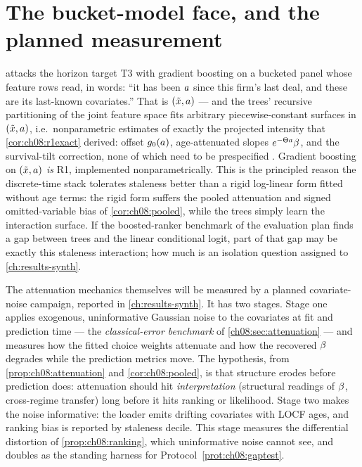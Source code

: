 \section{The bucket-model face, and the planned measurement}
\label{ch08:sec:buckets}

 attacks the horizon target T3 with gradient boosting
on a bucketed panel whose feature rows read, in words: ``it has been
$a$ since this firm's last deal, and these are its last-known
covariates.'' That is $(\tilde{x}, a)$ --- and the trees'
recursive partitioning of the joint feature space fits arbitrary
piecewise-constant surfaces in $(\tilde{x}, a)$, i.e.\
nonparametric estimates of exactly the projected intensity that
\cref{cor:ch08:r1exact} derived: offset $g_0(a)$,
age-attenuated slopes $e^{-\Theta a}\beta$, and the survival-tilt
correction, none of which need to be prespecified
\citep{friedman2001,chenguestrin2016}. Gradient boosting on
$(\tilde{x}, a)$ \emph{is} R1, implemented nonparametrically.
This is the principled reason the discrete-time stack tolerates
staleness better than a rigid log-linear form fitted without age terms:
the rigid form suffers the pooled attenuation and signed
omitted-variable bias of \cref{cor:ch08:pooled}, while the trees simply
learn the interaction surface. If the boosted-ranker benchmark of the
evaluation plan finds a gap between trees and the linear conditional
logit, part of that gap may be exactly this staleness interaction; how
much is an isolation question assigned to \cref{ch:results-synth}.

The attenuation mechanics themselves will be measured by a planned
covariate-noise campaign, reported in \cref{ch:results-synth}. It has
two stages. Stage one applies exogenous, uninformative Gaussian noise to
the covariates at fit and prediction time --- the \emph{classical-error
benchmark} of \cref{ch08:sec:attenuation} --- and measures how the
fitted choice weights attenuate and how the recovered $\beta$ degrades
while the prediction metrics move. The hypothesis, from
\cref{prop:ch08:attenuation} and \cref{cor:ch08:pooled}, is that
structure erodes before prediction does: attenuation should hit
\emph{interpretation} (structural readings of $\beta$, cross-regime
transfer) long before it hits ranking or likelihood. Stage two makes the
noise informative: the loader emits drifting covariates with LOCF ages,
and ranking bias is reported by staleness decile. This stage measures
the differential distortion of \cref{prop:ch08:ranking}, which
uninformative noise cannot see, and doubles as the standing harness for
Protocol~\ref{prot:ch08:gaptest}.

